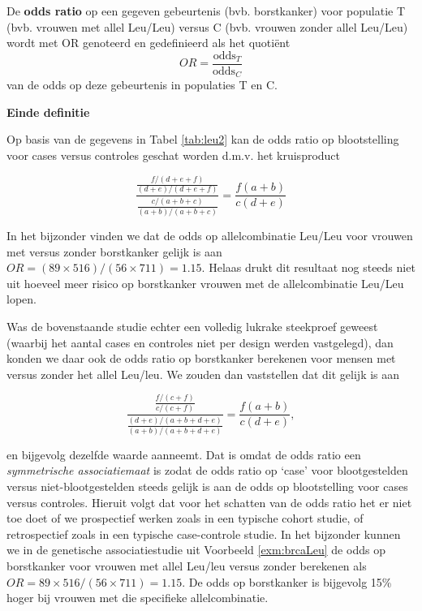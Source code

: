 \documentclass[
  12pt,dutch,coursenotes]{book}
\theoremstyle{definition}
\theoremstyle{definition}
\theoremstyle{definition}
\theoremstyle{remark}
\begin{document}
De \textbf{odds ratio} op een gegeven gebeurtenis (bvb. borstkanker) voor populatie T (bvb. vrouwen met allel Leu/Leu) versus C (bvb. vrouwen zonder allel Leu/Leu) wordt met OR genoteerd en gedefinieerd als het quotiënt
\begin{equation*}
OR=\frac{\mbox{odds}_T}{\mbox{odds}_C}
\end{equation*}
van de odds op deze gebeurtenis in populaties T en C.

\textbf{Einde definitie}

Op basis van de gegevens in Tabel \ref{tab:leu2} kan de odds ratio op
blootstelling voor cases versus controles geschat worden d.m.v. het kruisproduct

\begin{equation*}
\frac{ \frac{ f/(d+e+f)}{(d+e)/(d+e+f)} }{ \frac{c/(a+b+c)}{(a+b)/(a+b+c)}} = \frac{f(a+b)}{c (d+e)}
\end{equation*}

In het bijzonder vinden we dat de odds op allelcombinatie Leu/Leu voor vrouwen met versus zonder borstkanker gelijk is aan \(OR=(89\times 516)/(56\times 711)=1.15\). Helaas drukt dit resultaat nog steeds
niet uit hoeveel meer risico op borstkanker vrouwen met de allelcombinatie Leu/Leu lopen.

Was de bovenstaande studie echter een volledig lukrake steekproef geweest
(waarbij het aantal cases en controles niet per design werden vastgelegd),
dan konden we daar ook de odds ratio op borstkanker berekenen voor mensen
met versus zonder het allel Leu/leu. We zouden dan vaststellen dat dit gelijk is
aan

\begin{equation*}
\frac{ \frac{ f/(c+f)}{c/(c+f)} }{ \frac{(d+e)/(a+b+d+e)}{(a+b)/(a+b+d+e)}} = \frac{f(a+b)}{c(d+e)},
\end{equation*}

en bijgevolg dezelfde waarde aanneemt. Dat is omdat de odds ratio een
\emph{symmetrische associatiemaat} is zodat de odds ratio op `case' voor
blootgestelden versus niet-blootgestelden steeds gelijk is aan de odds op
blootstelling voor cases versus controles. Hieruit volgt dat voor het
schatten van de odds ratio het er niet toe doet of we prospectief werken
zoals in een typische cohort studie, of retrospectief zoals in een typische
case-controle studie. In het bijzonder kunnen we in de genetische associatiestudie uit
Voorbeeld \ref{exm:brcaLeu} de odds op borstkanker voor vrouwen met allel Leu/leu
versus zonder berekenen als \(OR=89\times 516/(56\times 711)=1.15\).
De odds op borstkanker is bijgevolg 15\% hoger bij vrouwen met die specifieke allelcombinatie.
\end{document}
